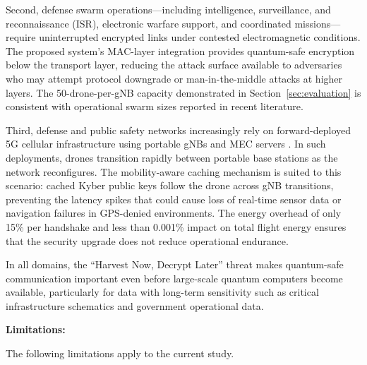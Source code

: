 \documentclass{ieeeaccess}
\begin{document}
Second, defense swarm operations---including intelligence, surveillance, and reconnaissance (ISR), electronic warfare support, and coordinated missions---require uninterrupted encrypted links under contested electromagnetic conditions. The proposed system's MAC-layer integration provides quantum-safe encryption below the transport layer, reducing the attack surface available to adversaries who may attempt protocol downgrade or man-in-the-middle attacks at higher layers. The 50-drone-per-gNB capacity demonstrated in Section~\ref{sec:evaluation} is consistent with operational swarm sizes reported in recent literature.

Third, defense and public safety networks increasingly rely on forward-deployed 5G cellular infrastructure using portable gNBs and MEC servers \cite{ref16}. In such deployments, drones transition rapidly between portable base stations as the network reconfigures. The mobility-aware caching mechanism is suited to this scenario: cached Kyber public keys follow the drone across gNB transitions, preventing the latency spikes that could cause loss of real-time sensor data or navigation failures in GPS-denied environments. The energy overhead of only 15\% per handshake and less than 0.001\% impact on total flight energy ensures that the security upgrade does not reduce operational endurance.

In all domains, the ``Harvest Now, Decrypt Later'' threat makes quantum-safe communication important even before large-scale quantum computers become available, particularly for data with long-term sensitivity such as critical infrastructure schematics and government operational data.

\vspace{2mm}\noindent\textbf{Limitations:}

The following limitations apply to the current study.
\end{document}
